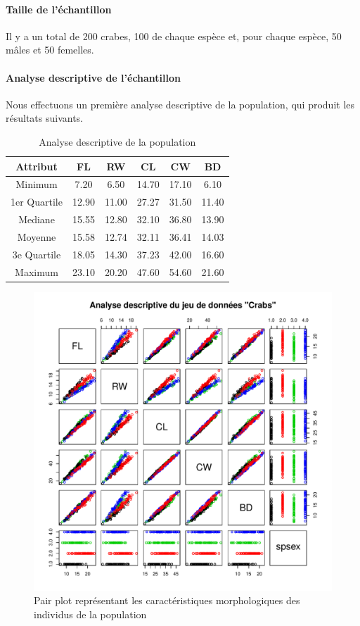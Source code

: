 \documentclass{report}
\begin{document}
\paragraph{Taille de l'échantillon}
Il y a un total de 200 crabes, 100 de chaque espèce et, pour chaque espèce, 50
mâles et 50 femelles.
\paragraph{Analyse descriptive de l'échantillon}
Nous effectuons un première analyse descriptive de la population, qui produit les résultats suivants.
\begin{table}[h!]
  \centering
  \caption{Analyse descriptive de la population}
  \label{tab:table4}
  \begin{tabular}{c|c|c|c|c|c}
    Attribut & FL & RW & CL & CW & BD\\
    \hline
    Minimum & 7.20 & 6.50 & 14.70 & 17.10 & 6.10\\
    \hline
    1er Quartile & 12.90 & 11.00 & 27.27 & 31.50 & 11.40\\
    \hline
    Mediane & 15.55 & 12.80 & 32.10 & 36.80 & 13.90\\
    \hline
    Moyenne & 15.58 & 12.74 & 32.11 & 36.41 & 14.03\\
    \hline
    3e Quartile & 18.05 & 14.30 & 37.23 & 42.00 & 16.60\\
    \hline
    Maximum & 23.10 & 20.20 & 47.60 & 54.60 & 21.60
  \end{tabular}
\end{table}
\begin{figure}[h!]
\begin{center}
    \includegraphics[width=\textwidth]{plotcrabsp1.pdf}
    \caption{Pair plot représentant les caractéristiques morphologiques des individus de la population}
\end{center}
\end{figure}
\end{document}
